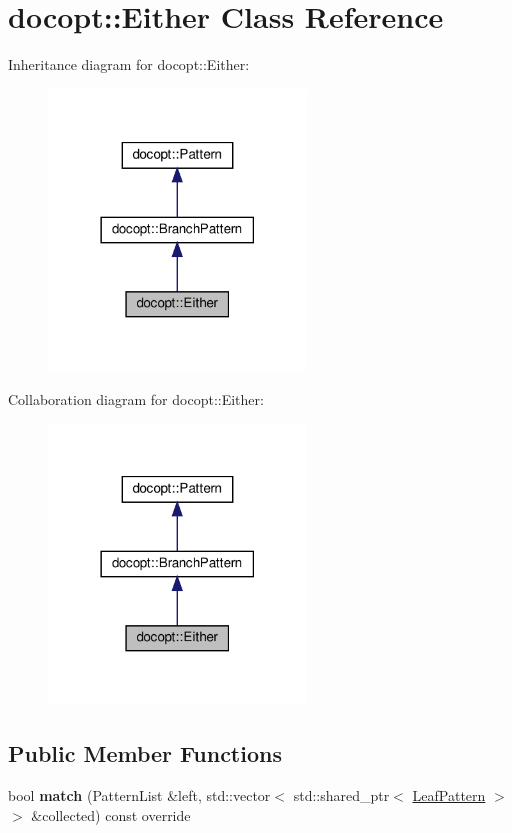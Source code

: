 \hypertarget{classdocopt_1_1Either}{}\section{docopt\+:\+:Either Class Reference}
\label{classdocopt_1_1Either}


Inheritance diagram for docopt\+:\+:Either\+:
\nopagebreak
\begin{figure}[H]
\begin{center}
\leavevmode
\includegraphics[width=194pt]{classdocopt_1_1Either__inherit__graph}
\end{center}
\end{figure}


Collaboration diagram for docopt\+:\+:Either\+:
\nopagebreak
\begin{figure}[H]
\begin{center}
\leavevmode
\includegraphics[width=194pt]{classdocopt_1_1Either__coll__graph}
\end{center}
\end{figure}
\subsection*{Public Member Functions}
\begin{DoxyCompactItemize}
\item 
\mbox{\label{classdocopt_1_1Either_aedbb09ed31a6c321d274040e3179d449}} 
bool {\bfseries match} (Pattern\+List \&left, std\+::vector$<$ std\+::shared\+\_\+ptr$<$ \hyperlink{classdocopt_1_1LeafPattern}{Leaf\+Pattern} $>$$>$ \&collected) const override
\end{DoxyCompactItemize}
